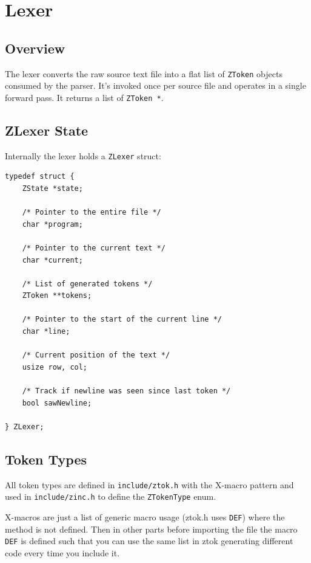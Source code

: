 \chapter{Lexer}
\label{ch:lexer}

\section{Overview}

The lexer converts the raw source text file into a flat list of \texttt{ZToken} objects consumed by the parser.
It's invoked once per source file and operates in a single forward pass.
It returns a list of \texttt{ZToken *}.

\section{ZLexer State}

Internally the lexer holds a \texttt{ZLexer} struct:

\begin{verbatim}
typedef struct {
	ZState *state;

	/* Pointer to the entire file */
	char *program;

	/* Pointer to the current text */
	char *current;

	/* List of generated tokens */
	ZToken **tokens;

	/* Pointer to the start of the current line */
	char *line;

	/* Current position of the text */
	usize row, col;

	/* Track if newline was seen since last token */
	bool sawNewline;

} ZLexer;
\end{verbatim}

\section{Token Types}
All token types are defined in \texttt{include/ztok.h} with the X-macro pattern and used in \texttt{include/zinc.h} to define the \texttt{ZTokenType} enum.

\begin{note}
X-macros are just a list of generic macro usage (ztok.h uses \texttt{DEF}) where the method is not defined.
Then in other parts before importing the file the macro \texttt{DEF} is defined such that you can use the same list in ztok generating different code every time you include it.
\end{note}

